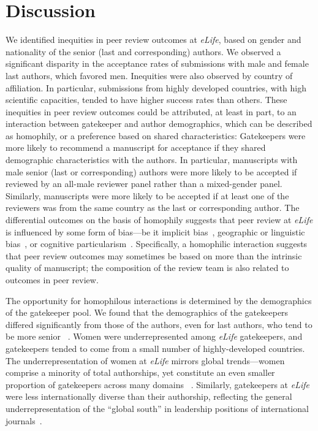 \documentclass[10pt,letterpaper]{article}
\begin{document}
\section*{Discussion}
We identified inequities in peer review outcomes at \textit{eLife}, based on gender and nationality of the senior (last and corresponding) authors. We observed a significant disparity in the acceptance rates of submissions with male and female last authors, which favored men. Inequities were also observed by country of affiliation. In particular, submissions from highly developed countries, with high scientific capacities, tended to have higher success rates than others. These inequities in peer review outcomes could be attributed, at least in part, to an interaction between gatekeeper and author demographics, which can be described as homophily, or a preference based on shared characteristics: Gatekeepers were more likely to recommend a manuscript for acceptance if they shared demographic characteristics with the authors. In particular, manuscripts with male senior (last or corresponding) authors were more likely to be accepted if reviewed by an all-male reviewer panel rather than a mixed-gender panel. Similarly, manuscripts were more likely to be accepted if at least one of the reviewers was from the same country as the last or corresponding author. The differential outcomes on the basis of homophily suggests that peer review at \textit{eLife} is influenced by some form of bias—be it implicit bias~\cite{lee_bias_2013, wenneras_nepotism_1997}, geographic or linguistic bias~\cite{kliewer_peer_2004, ross_effect_2006, coates_language_2002}, or cognitive particularism~\cite{travis_new_1991}. Specifically, a homophilic interaction suggests that peer review outcomes may sometimes be based on more than the intrinsic quality of manuscript; the composition of the review team is also related to outcomes in peer review.

The opportunity for homophilous interactions is determined by the demographics of the gatekeeper pool. We found that the demographics of the gatekeepers differed significantly from those of the authors, even for last authors, who tend to be more senior 
~\cite{costas_age_2011, macaluso_is_2016, baerlocher_meaning_2007, tscharntke_author_2007}. Women were underrepresented among \textit{eLife} gatekeepers, and gatekeepers tended to come from a small number of highly-developed countries. The underrepresentation of women at \textit{eLife} mirrors global trends—women comprise a minority of total authorships, yet constitute an even smaller proportion of gatekeepers across many domains ~\cite{amrein_women_2011, cho_women_2014,mauleon_assessing_2013, metz_gender_2009, metz_update_2012, morton_women_2007, stegmaier_getting_2011, topaz_gender_2016, noauthor_natures_2018}. Similarly, gatekeepers at \textit{eLife} were less internationally diverse than their authorship, reflecting the general underrepresentation of the “global south” in leadership positions of international journals~\cite{espin_persistent_2017}. 
\end{document}
